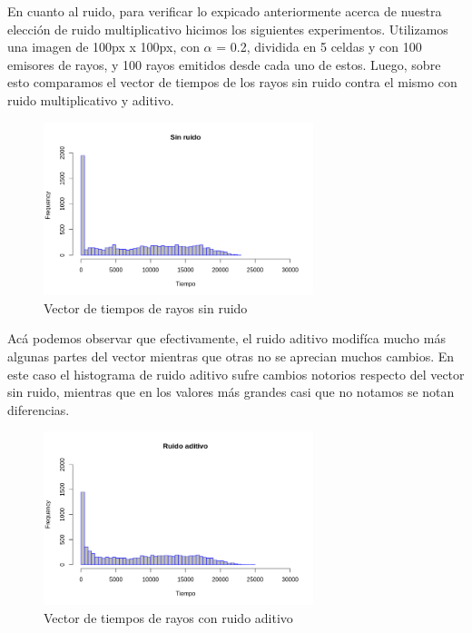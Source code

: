 

\par En cuanto al ruido, para verificar lo expicado anteriormente acerca de nuestra elección de ruido multiplicativo hicimos los siguientes experimentos.
Utilizamos una imagen de 100px x 100px, con $\alpha$ = 0.2, dividida en 5 celdas y con 100 emisores de rayos, y 100 rayos emitidos desde cada uno de estos. Luego, sobre esto comparamos el vector de tiempos de los rayos sin ruido contra el mismo con ruido multiplicativo y aditivo. 

\begin{figure}[H]
	\centering	\includegraphics[width=0.7\textwidth]{img/sinRuido.png}
	\caption{Vector de tiempos de rayos sin ruido}
	\label{fig:etiqueta}
\end{figure}
\par Acá podemos observar que efectivamente, el ruido aditivo modifíca mucho más algunas partes del vector mientras que otras no se aprecian muchos cambios. En este caso el histograma de ruido aditivo sufre cambios notorios respecto del vector sin ruido, mientras que en los valores más grandes casi que no notamos se notan diferencias.

\begin{figure}[H]
	\centering	\includegraphics[width=0.7\textwidth]{img/ruidoAditivo.png}
	\caption{Vector de tiempos de rayos con ruido aditivo}
	\label{fig:etiqueta}
\end{figure}

